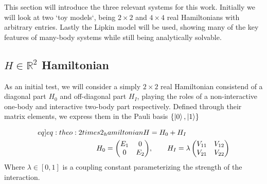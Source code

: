 \label{sec:qs}
This section will introduce the three relevant systems for this work. Initially we will look at two `toy models`, being $2\times2$ and $4 \times 4$ real Hamiltonians with arbitrary entries. Lastly the Lipkin model will be used, showing many of the key features of many-body systems while still being analytically solvable.   

\subsection{$H \in \mathbb{R}^2$ Hamiltonian}
As an initial test, we will consider a simply $2\times 2$ real Hamiltonian consistend of a diagonal part $H_0$ and off-diagonal part $H_I$, playing the roles of a non-interactive one-body and interactive two-body part respectively. Defined through their matrix elements, we express them in the Pauli basis $\{\ket{0},\ket{1}\}$

\begin{align}
    \begin{split} \label[eq]{eq:theo:2times2_hamiltonian}
        H &= H_0 + H_I \\
        H_0 = \begin{pmatrix}
            E_1 & 0 \\
            0 & E_2
        \end{pmatrix}&, \hspace{20px}
        H_I = \lambda \begin{pmatrix}
            V_{11} & V_{12} \\
            V_{21} & V_{22}
        \end{pmatrix}
    \end{split}
\end{align}
Where $\lambda \in [0,1]$ is a coupling constant parameterizing the strength of the interaction. 

